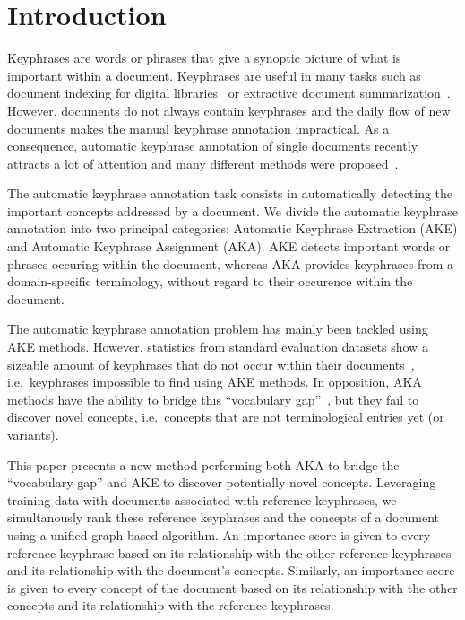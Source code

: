 \section{Introduction}
\label{sec: introduction}
  Keyphrases are words or phrases that give a synoptic picture of what is
  important within a document. Keyphrases are useful in many tasks such as
  document indexing for digital
  libraries~\cite{gutwin1999keyphrasesfordigitallibraries} or extractive
  document summarization~\cite{litvak2008graphbased}. However, documents do not
  always contain keyphrases and the daily flow of new documents makes the manual
  keyphrase annotation impractical. As a consequence, automatic keyphrase
  annotation of single documents recently attracts a lot of attention and many
  different methods were proposed~\cite{hasan2014state_of_the_art}.

  The automatic keyphrase annotation task consists in automatically detecting
  the important concepts addressed by a document. We divide the automatic
  keyphrase annotation into two principal categories: Automatic Keyphrase
  Extraction (AKE) and Automatic Keyphrase Assignment (AKA). AKE detects
  important words or phrases occuring within the document, whereas AKA provides
  keyphrases from a domain-specific terminology, without regard to their
  occurence within the document.

  The automatic keyphrase annotation problem has mainly been tackled using AKE
  methods. However, statistics from standard evaluation datasets show a sizeable
  amount of keyphrases that do not occur within their
  documents~\cite{bougouin2013topicrank}, i.e.~keyphrases impossible to find
  using AKE methods. In opposition, AKA methods have the ability to bridge this
  ``vocabulary gap''~\cite{liu2011vocabularygap}, but they fail to discover
  novel concepts, i.e.~concepts that are not terminological entries yet (or
  variants).

  This paper presents a new method performing both AKA to bridge the
  ``vocabulary gap'' and AKE to discover potentially novel concepts. Leveraging
  training data with documents associated with reference keyphrases, we
  simultanously rank these reference keyphrases and the concepts of a document
  using a unified graph-based algorithm. An importance score is given to every
  reference keyphrase based on its relationship with the other reference
  keyphrases and its relationship with the document's concepts. Similarly, an
  importance score is given to every concept of the document based on its
  relationship with the other concepts and its relationship with the reference
  keyphrases.



